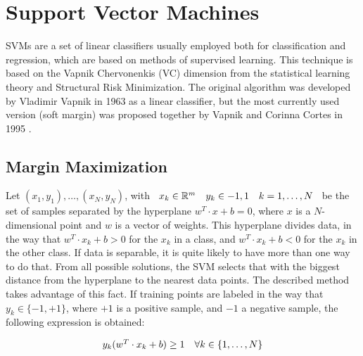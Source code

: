 
\graphicspath{{./images/chapter06/bmps/}{./images/chapter06/vects/}{./images/chapter06/}}

\chapter{Support Vector Machines}\label{ch:appendixSVM}

\acfp{SVM} are a set of linear classifiers usually employed both for classification and regression, which are based on methods of supervised learning. This technique is based on the Vapnik Chervonenkis (VC) dimension from the statistical learning theory and Structural Risk Minimization.
The original algorithm was developed by Vladimir Vapnik in 1963 as a linear classifier, but the most currently used version (soft margin) was proposed together by Vapnik and Corinna Cortes in 1995 \citep{cortes1995support}.

\section{Margin Maximization}\label{ch:appendixSVM_01}

Let $(x_1,y_1),\dots,(x_N,y_N)$, with $\begin{array}{l c r}  
  x_k \in \mathbb{R}^m & y_k \in {-1,1} & k=1,\dots,N 
\end{array}$ be the set of samples separated by the hyperplane $w^T \cdot x + b = 0$, where $x$ is a $N$-dimensional point and $w$ is a vector of weights. This hyperplane divides data, in the way that $w^T \cdot x_k + b > 0$ for the $x_k$ in a class, and $w^T \cdot x_k + b < 0$ for the $x_k$ in the other class. If data is separable, it is quite likely to have more than one way to do that. From all possible solutions, the \ac{SVM} selects that with the biggest distance from the hyperplane to the nearest data points. The described method takes advantage of this fact.
If training points are labeled in the way that $y_k \in \{ -1, +1\}$, where $+1$ is a positive sample, and $-1$ a negative sample, the following expression is obtained:

\begin{equation}\label{eq:appendixSVM_hyperplane_scaled}
  \begin{array}{l r}
    y_k (w^T \cdot x_k + b) \geq 1 & \forall k \in \{1, \dots, N \}
  \end{array}
\end{equation}


